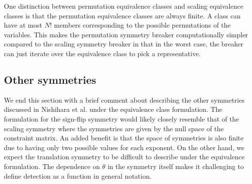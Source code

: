 One distinction between permutation equivalence classes and scaling equivalence classes is that the permutation equivalence classes are always finite. A class can have at most $N!$ members corresponding to the possible permutations of the variables. This makes the permutation symmetry breaker computationally simpler compared to the scaling symmetry breaker in that in the worst case, the breaker can just iterate over the equivalence class to pick a representative.


\subsection{Other symmetries}

We end this section with a brief comment about describing the other symmetries discussed in Nishihara et al. under the equivalence class formulation. The formulation for the sign-flip symmetry would likely closely resemble that of the scaling symmetry where the symmetries are given by the null space of the constraint matrix. An added benefit is that the space of symmetries is also finite due to having only two possible values for each exponent. On the other hand, we expect the translation symmetry to be difficult to describe under the equivalence formulation. The dependence on $\theta$ in the symmetry itself makes it challenging to define detection as a function in general notation.


